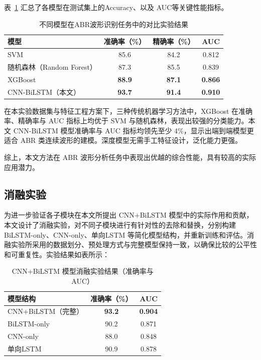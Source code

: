 表~\ref{tab:comparisonAccuacy} 汇总了各模型在测试集上的Accuracy、以及 AUC等关键性能指标。

\begin{table}[H]
\centering
\caption{不同模型在ABR波形识别任务中的对比实验结果}
\label{tab:comparisonAccuacy}
\begin{tabular}{lccc}
\hline
\textbf{模型} & \textbf{准确率（\%）} & \textbf{精确率（\%）} & \textbf{AUC} \\
\hline
SVM                        & 85.6 & 84.2 & 0.812 \\
随机森林（Random Forest） & 87.3 & 85.5 & 0.839 \\
XGBoost                    & \textbf{88.9} & \textbf{87.1} & \textbf{0.866} \\
CNN-BiLSTM（本文）        & \textbf{93.7} & \textbf{91.4} & \textbf{0.910} \\
\hline
\end{tabular}
\end{table}
在本实验数据集与特征工程方案下，三种传统机器学习方法中，XGBoost 在准确率、精确率与 AUC 指标上均优于 SVM 与随机森林，表现出较强的分类能力。本文 CNN-BiLSTM 模型准确率与 AUC 指标均领先至少 4\%，显示出端到端模型更适合 ABR 类连续波形的建模。深度模型无需手工特征设计，泛化能力更强。

综上，本文方法在 ABR 波形分析任务中表现出优越的综合性能，具有较高的实际应用潜力。


\subsection*{消融实验}

为进一步验证各子模块在本文所提出 CNN+BiLSTM 模型中的实际作用和贡献，本文设计了消融实验，对不同子模块进行有针对性的去除和替换，分别构建 BiLSTM-only、CNN-only、单向LSTM 等简化模型结构，并重新训练和评估。消融实验所采用的数据划分、预处理方式与完整模型保持一致，以确保比较的公平性和可重复性。实验结果如表所示：

\begin{table}[H]
\centering
\caption{CNN+BiLSTM 模型消融实验结果（准确率与AUC）}
\label{tab:ablation_results}
\begin{tabular}{lcc}
\hline
\textbf{模型结构} & \textbf{准确率（\%）} & \textbf{AUC} \\
\hline
CNN+BiLSTM（完整） & \textbf{93.2} & \textbf{0.904} \\
BiLSTM-only        & 90.2          & 0.871 \\
CNN-only           & 88.0          & 0.848 \\
单向LSTM           & 90.9          & 0.878 \\
\hline
\end{tabular}
\end{table}

